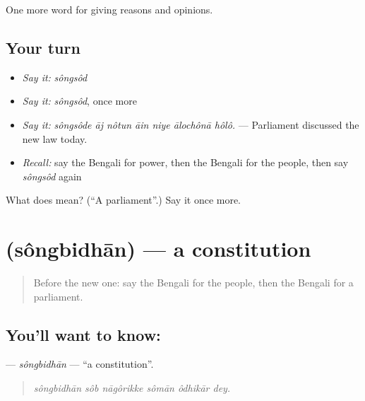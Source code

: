 \begin{grammarlens}[title={What you've built}]
One more word for giving reasons and opinions.
\end{grammarlens}

\subsection*{Your turn}
\begin{itemize}
\raggedright
  \item \emph{Say it:} \emph{sôngsôd}
  \item \emph{Say it:} \emph{sôngsôd}, once more
  \item \emph{Say it:} \emph{sôngsôde āj nôtun āin niye ālochônā hôlô.} — Parliament discussed the new law today.
  \item \emph{Recall:} say the Bengali for power, then the Bengali for the people, then say \emph{sôngsôd} again
\end{itemize}

\begin{tcolorbox}[breakable,colback=teal!4,colframe=teal!35!black,title={Before you move on}]
What does  mean? (\textquotedblleft{}A parliament\textquotedblright{}.) Say it once more.
\end{tcolorbox}
\section[\texorpdfstring{\bn{সংবিধান} (sôngbidhān)}{সংবিধান (sôngbidhān)}]{ (sôngbidhān) — a constitution}

\label{lesson:BN-C345-songbidhan}



\begin{quote}
Before the new one: say the Bengali for the people, then the Bengali for a parliament.
\end{quote}

\subsection*{You'll want to know: }
\textbf{} — \emph{sôngbidhān} — \textquotedblleft{}a constitution\textquotedblright{}.

\begin{quote}
     
\end{quote}

\begin{quote}
\emph{sôngbidhān sôb nāgôrikke sômān ôdhikār dey.}
\end{quote}

